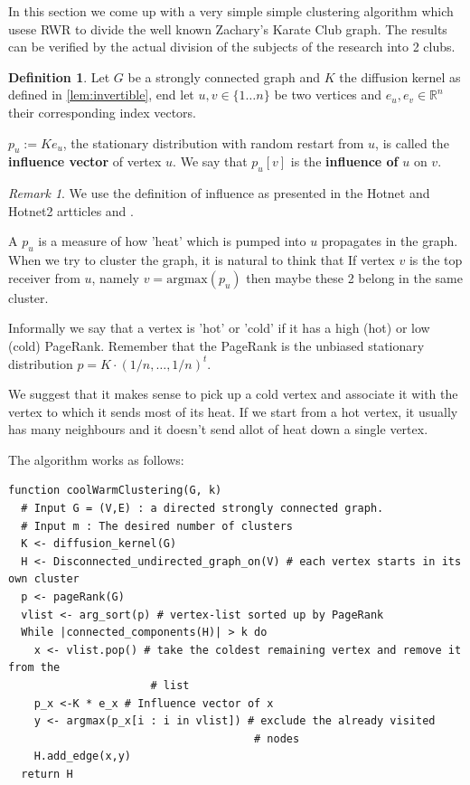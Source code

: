 \documentclass[a4paper,10pt]{article}
\newcommand{\R}{\mathbb{R}}
\theoremstyle{definition}
\newtheorem{mydef}{Definition}[section]
\theoremstyle{remark}
\newtheorem{remark}{Remark}
\theoremstyle{plain}
\begin{document}
In this section we come up with a very simple simple clustering
algorithm which usese RWR to divide the well known Zachary's Karate
Club graph. The results can be verified by the actual division of
the subjects of the research into 2 clubs.

\begin{mydef}
\label{def:influence}
Let $G$ be a strongly connected graph and $K$ the diffusion kernel as defined in
\ref{lem:invertible}, end let $u,v \in \{1 \dots n\}$ be two vertices and $e_u,
e_v \in \R^n$ their corresponding index vectors.

$p_u := K e_u$, the stationary distribution with random restart from $u$,
is called the \textbf{influence vector} of vertex $u$. We say that $p_u[v]$
is the \textbf{influence of} $u$ on $v$.
\end{mydef}

\begin{remark}
\label{rem:influence}
We use the definition of influence as presented in the Hotnet and
Hotnet2 artticles \cite{vandin2012discovery} and
\cite{leiserson2015pan}.
\end{remark}

A $p_u$ is a measure of how 'heat' which is pumped into $u$ propagates in the graph.
When we try to cluster the graph, it is natural to think that If vertex $v$
is the top receiver from $u$, namely $v = \text{argmax}(p_u)$ then maybe these 2
belong in the same cluster.

Informally we say that a vertex is 'hot' or 'cold' if it has a high (hot) or low
(cold) PageRank. Remember that the PageRank is the unbiased stationary distribution
$p = K \cdot (1/n, \dots, 1/n)^t$.

We suggest that it makes sense to pick up a
cold vertex and associate it with the vertex to which it sends most of its heat.
If we start from a hot vertex, it usually has many neighbours and it doesn't
send allot of heat down a single vertex.

The algorithm works as follows:

\begin{lstlisting}
function coolWarmClustering(G, k)
  # Input G = (V,E) : a directed strongly connected graph.
  # Input m : The desired number of clusters
  K <- diffusion_kernel(G)
  H <- Disconnected_undirected_graph_on(V) # each vertex starts in its own cluster 
  p <- pageRank(G)
  vlist <- arg_sort(p) # vertex-list sorted up by PageRank 
  While |connected_components(H)| > k do
    x <- vlist.pop() # take the coldest remaining vertex and remove it from the
                      # list
    p_x <-K * e_x # Influence vector of x
    y <- argmax(p_x[i : i in vlist]) # exclude the already visited
                                      # nodes
    H.add_edge(x,y)
  return H
\end{lstlisting}
\end{document}
